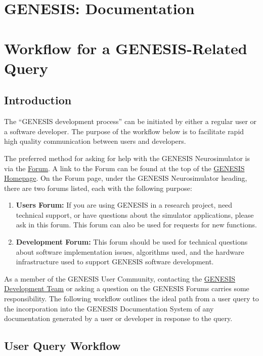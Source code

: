 \documentclass[12pt]{article}
\begin{document}
\section*{GENESIS: Documentation}

\section*{Workflow for a GENESIS-Related Query}

\subsection*{Introduction}

The ``GENESIS development process'' can be initiated by either a
regular user or a software developer. The purpose of the workflow
below is to facilitate rapid high quality communication between users
and developers.

The preferred method for asking for help with the GENESIS
Neurosimulator is via the
\href{http://www.genesis-sim.org/forum}{Forum}.  A link to the Forum
can be found at the top of the
\href{http://www.genesis-sim.org/}{GENESIS Homepage}.  On the Forum
page, under the GENESIS Neurosimulator heading, there are two forums
listed, each with the following purpose:

\begin{enumerate}
\item {\bf Users Forum:} If you are using GENESIS in a research
  project, need technical support, or have questions about the
  simulator applications, please ask in this forum.  This forum can
  also be used for requests for new functions.
\item {\bf Development Forum:} This forum should be used for technical
  questions about software implementation issues, algorithms used, and
  the hardware infrastructure used to support GENESIS software
  development.
\end{enumerate}

As a member of the GENESIS User Community, contacting the
\href{http://www.genesis-sim.org/contact}{GENESIS Development Team} or
asking a question on the GENESIS Forums carries some responsibility. The
following workflow outlines the ideal path from a user query to the
incorporation into the GENESIS Documentation System of any
documentation generated by a user or developer in response to the query.

\subsection*{User Query Workflow}
\end{document}
